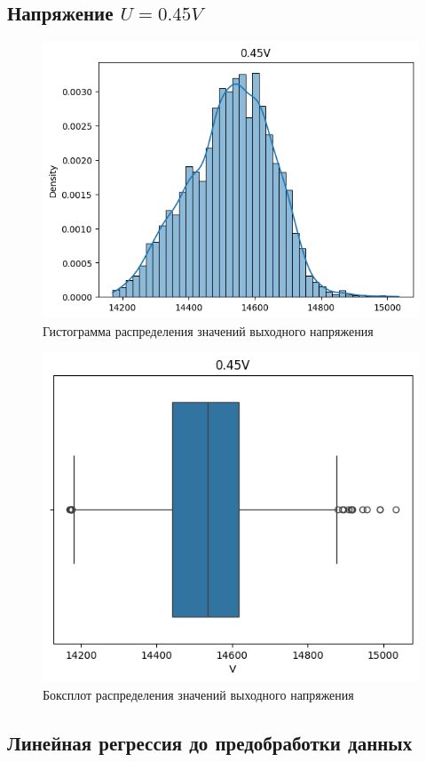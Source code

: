 \documentclass[12pt]{article}
\begin{document}
\subsection{Напряжение $U = 0.45V$}
\begin{figure}[htbp!]
    \begin{center}
        \includegraphics[width = 0.7\linewidth]{plots/0.45Vhist.png}
        \caption{Гистограмма распределения значений выходного напряжения}
    \end{center}
\end{figure}
\begin{figure}[htbp!]
    \begin{center}
        \includegraphics[width = 0.7\linewidth]{plots/0.45Vbox.png}
        \caption{Боксплот распределения значений выходного напряжения}
    \end{center}
\end{figure}

\subsection{Линейная регрессия до предобработки данных}
\end{document}
